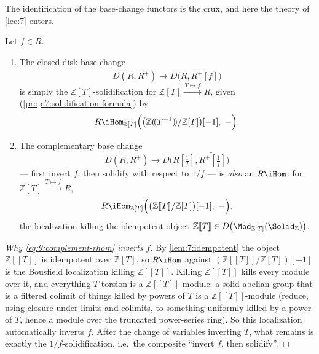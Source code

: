 The identification of the base-change functors is the crux, and here the theory
of \cref{lec:7} enters.

\begin{lemma}
\label{lem:9:base-change-rhom}
Let $f\in R$.
\begin{enumerate}
\item The closed-disk base change
\begin{equation*}
D(R,R^{+})\longrightarrow D\bigl(R,\widetilde{R^{+}[f]}\bigr)
\end{equation*}
is simply the $\mathbb{Z}[T]$-solidification for $\mathbb{Z}[T]\xrightarrow{\,
T\mapsto f\,}R$, given (\cref{prop:7:solidification-formula}) by
\begin{equation*}
R\iHom_{\mathbb{Z}[T]}\Bigl(\bigl(\mathbb{Z}(\!(T^{-1})\!)/\mathbb{Z}[T]\bigr)
[-1],\ -\Bigr).
\end{equation*}
\item The complementary base change
\begin{equation*}
D(R,R^{+})\longrightarrow D\bigl(R[\tfrac1f],\widetilde{R^{+}[\tfrac1f]}\bigr)
\end{equation*}
--- first invert $f$, then solidify with respect to $1/f$ --- is \emph{also} an
$R\iHom$: for $\mathbb{Z}[T]\xrightarrow{\,T\mapsto f\,}R$,
\begin{equation}
\label{eq:9:complement-rhom}
R\iHom_{\mathbb{Z}[T]}\Bigl(\bigl(\mathbb{Z}[\![T]\!]/\mathbb{Z}[T]\bigr)[-1],\
-\Bigr),
\end{equation}
the localization killing the idempotent object $\mathbb{Z}[\![T]\!]\in
D\bigl(\Mod_{\mathbb{Z}[T]}(\Solid_{\mathbb{Z}})\bigr)$.
\end{enumerate}
\end{lemma}

\begin{proof}[Why \eqref{eq:9:complement-rhom} inverts $f$]
By \cref{lem:7:idempotent} the object $\mathbb{Z}[\![T]\!]$ is idempotent over
$\mathbb{Z}[T]$, so $R\iHom$ against $(\mathbb{Z}[\![T]\!]/\mathbb{Z}[T])[-1]$ is
the Bousfield localization killing $\mathbb{Z}[\![T]\!]$. Killing
$\mathbb{Z}[\![T]\!]$ kills every module over it, and everything $T$-torsion is a
$\mathbb{Z}[\![T]\!]$-module: a solid abelian group that is a filtered colimit of
things killed by powers of $T$ is a $\mathbb{Z}[\![T]\!]$-module (reduce, using
closure under limits and colimits, to something uniformly killed by a power of
$T$, hence a module over the truncated power-series ring). So this localization
automatically inverts $f$. After the change of variables inverting $T$, what
remains is exactly the $1/f$-solidification, i.e.\ the composite ``invert $f$,
then solidify''.
\end{proof}

